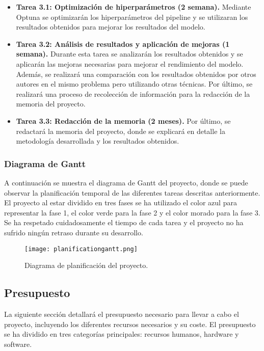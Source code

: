 \begin{itemize}
    \item \textbf{Tarea 3.1: Optimización de hiperparámetros (2 semana).} Mediante Optuna se optimizarán los
          hiperparámetros del pipeline y se utilizaran los resultados obtenidos para mejorar los resultados del
          modelo.
    \item \textbf{Tarea 3.2: Análisis de resultados y aplicación de mejoras (1 semana).} Durante esta tarea se
          analizarán los resultados obtenidos y se aplicarán las mejoras necesarias para mejorar el rendimiento del
          modelo. Además, se realizará una comparación con los resultados obtenidos por otros autores en el mismo
          problema pero utilizando otras técnicas. Por último, se realizará una proceso de recolección de información
          para la redacción de la memoria del proyecto.
    \item \textbf{Tarea 3.3: Redacción de la memoria (2 meses).} Por último, se redactará la memoria del proyecto,
          donde se explicará en detalle la metodología desarrollada y los resultados obtenidos.
\end{itemize}

\subsubsection{Diagrama de Gantt}
A continuación se muestra el diagrama de Gantt del proyecto, donde se puede
observar la planificación temporal de las diferentes tareas descritas
anteriormente. El proyecto al estar dividido en tres fases se ha utilizado el
color azul para representar la fase 1, el color verde para la fase 2 y el color
morado para la fase 3. Se ha respetado cuidadosamente el tiempo de cada tarea y
el proyecto no ha sufrido ningún retraso durante su desarrollo.

\begin{figure}
    \centering
    \texttt{[image: planificationgantt.png]}
    \caption{Diagrama de planificación del proyecto.}\label{fig:gantt-planification}
\end{figure}

\subsection{Presupuesto}
La siguiente sección detallará el presupuesto necesario para llevar a cabo el
proyecto, incluyendo los diferentes recursos necesarios y su coste. El
presupuesto se ha dividido en tres categorías principales: recursos humanos,
hardware y software.

